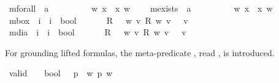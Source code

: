\begin{isabellebody}
\isamarkupfalse%
\ mforall\ {\isacharcolon}{\isacharcolon}\ {\isachardoublequoteopen}{\isacharparenleft}{\isacharprime}a\ {\isasymRightarrow}\ {\isasymsigma}{\isacharparenright}\ {\isasymRightarrow}\ {\isasymsigma}{\isachardoublequoteclose}\ \ \ {\isachardoublequoteopen}{\isasymforall}\ {\isasymPhi}\ {\isasymequiv}\ {\isacharparenleft}{\isasymlambda}w{\isachardot}\ {\isasymforall}x{\isachardot}\ {\isasymPhi}\ x\ w{\isacharparenright}{\isachardoublequoteclose}\ \ \ \isanewline
{}\isamarkupfalse%
\ mexists\ {\isacharcolon}{\isacharcolon}\ {\isachardoublequoteopen}{\isacharparenleft}{\isacharprime}a\ {\isasymRightarrow}\ {\isasymsigma}{\isacharparenright}\ {\isasymRightarrow}\ {\isasymsigma}{\isachardoublequoteclose}\ \ \ {\isachardoublequoteopen}{\isasymexists}\ {\isasymPhi}\ {\isasymequiv}\ {\isacharparenleft}{\isasymlambda}w{\isachardot}\ {\isasymexists}x{\isachardot}\ {\isasymPhi}\ x\ w{\isacharparenright}{\isachardoublequoteclose}\isanewline
{}\isamarkupfalse%
\ mbox\ {\isacharcolon}{\isacharcolon}\ {\isachardoublequoteopen}{\isacharparenleft}i\ {\isasymRightarrow}\ i\ {\isasymRightarrow}\ bool{\isacharparenright}\ {\isasymRightarrow}\ {\isasymsigma}\ {\isasymRightarrow}\ {\isasymsigma}{\isachardoublequoteclose}\ \ \ {\isachardoublequoteopen}{\isasymbox}\isactrlsup R\ {\isasymphi}\ {\isasymequiv}\ {\isacharparenleft}{\isasymlambda}w{\isachardot}\ {\isasymforall}v{\isachardot}\ {\isacharparenleft}R\ w\ v{\isacharparenright}\ {\isasymlongrightarrow}\ {\isasymphi}\ v{\isacharparenright}{\isachardoublequoteclose}\isanewline
{}\isamarkupfalse%
\ mdia\ {\isacharcolon}{\isacharcolon}\ {\isachardoublequoteopen}{\isacharparenleft}i\ {\isasymRightarrow}\ i\ {\isasymRightarrow}\ bool{\isacharparenright}\ {\isasymRightarrow}\ {\isasymsigma}\ {\isasymRightarrow}\ {\isasymsigma}{\isachardoublequoteclose}\ \ \ {\isachardoublequoteopen}{\isasymdiamond}\isactrlsup R\ {\isasymphi}\ {\isasymequiv}\ {\isacharparenleft}{\isasymlambda}w{\isachardot}\ {\isasymexists}v{\isachardot}\ R\ w\ v\ {\isasymand}\ {\isasymphi}\ v{\isacharparenright}{\isachardoublequoteclose}%
\begin{isamarkuptext}%
For grounding lifted formulas, the meta-predicate \isa{{\isacharbrackleft}{\isasymcdot}{\isacharbrackright}}, read , is introduced.%
\end{isamarkuptext}%
\isamarkuptrue%
\isamarkupfalse%
\ valid\ {\isacharcolon}{\isacharcolon}\ {\isachardoublequoteopen}{\isasymsigma}\ {\isasymRightarrow}\ bool{\isachardoublequoteclose}\ \ \ {\isachardoublequoteopen}{\isacharbrackleft}p{\isacharbrackright}\ {\isasymequiv}\ {\isasymforall}w{\isachardot}\ p\ w{\isachardoublequoteclose}%

\end{isabellebody}

